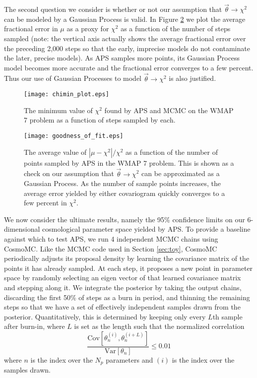\documentclass[useAMS,usenatbib]{aastex}
\begin{document}
The second question we consider is whether or not our assumption that
$\vec{\theta}\rightarrow\chi^2$ can be modeled by a Gaussian Process is 
valid.  In Figure
\ref{fig:goodness} we plot the average fractional error in $\mu$ as a proxy for $\chi^2$ as a
function of the number of steps sampled (note: the vertical axis actually shows the average
fractional error over the preceding 2,000 steps so that the early, imprecise models do not
contaminate the later, precise models).  As APS samples more points, its Gaussian Process
model becomes more accurate and the fractional error converges to a few percent.  Thus our
use of Gaussian Processes to model $\vec{\theta}\rightarrow\chi^2$ is also justified.

\begin{figure}
\texttt{[image: chimin\_plot.eps]}
\caption{
The minimum value of $\chi^2$ found by APS and MCMC on the WMAP 7 problem
as a function of 
steps sampled by each.
}
\label{fig:chimin}
\end{figure}

\begin{figure}
\texttt{[image: goodness\_of\_fit.eps]}
\caption{
The average value of $|\mu-\chi^2|/\chi^2$ as a function of the number of points
sampled by APS in the WMAP 7 problem.  
This is shown as a check on our assumption that
$\vec{\theta}\rightarrow\chi^2$ can be approximated as a Gaussian Process.
As the number of sample points increases, the average error yielded by either
covariogram quickly converges to a few percent in $\chi^2$.
}
\label{fig:goodness}
\end{figure}

We now consider the ultimate results, namely the 95\% confidence limits on
our 6-dimensional cosmological parameter space yielded by APS.
To provide a baseline against which to test APS, we run 4 independent MCMC
chains using CosmoMC.  Like the MCMC code used in Section \ref{sec:toy},
CosmoMC periodically adjusts its proposal density by learning the covariance
matrix of the points it has already sampled.  At each step, it proposes
a new point in parameter space by randomly selecting an eigen vector
of that learned covariance matrix and stepping along it.
We integrate the posterior by taking the output chains, discarding the first
50\% of steps as a burn in period, and thinning the remaining steps so that
we have a set of effectively independent samples drawn from the posterior.
Quantitatively, this is determined by keeping only every $L$th sample after
burn-in, where $L$ is set as the length such that the normalized correlation
\begin{equation}
\frac{\text{Cov}[\theta_n^{(i)},\theta_n^{(i+L)}]}
{\text{Var}[\theta_n]}\le 0.01
\end{equation}
where $n$ is the index over the $N_p$ parameters and $(i)$ is the index
over the samples drawn.
\end{document}
